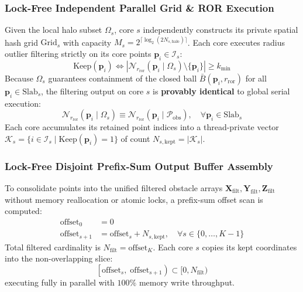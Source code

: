 \documentclass[journal,compsoc]{IEEEtran}
\begin{document}
\subsubsection{Lock-Free Independent Parallel Grid \& ROR Execution}
Given the local halo subset $\Omega_s$, core $s$ independently constructs its private spatial hash grid $\text{Grid}_s$ with capacity $M_s = 2^{\lceil \log_2(2 N_{s, \text{halo}}) \rceil}$.
Each core executes radius outlier filtering strictly on its core points $\bm{p}_i \in \mathcal{I}_s$:
\begin{equation}
\text{Keep}(\bm{p}_i) \iff \left| \mathcal{N}_{r_{\text{ror}}}(\bm{p}_i \mid \Omega_s) \setminus \{\bm{p}_i\} \right| \ge k_{\min}
\end{equation}
Because $\Omega_s$ guarantees containment of the closed ball $\bar{B}(\bm{p}_i, r_{\text{ror}})$ for all $\bm{p}_i \in \text{Slab}_s$, the filtering output on core $s$ is \textbf{provably identical} to global serial execution:
\begin{equation}
\mathcal{N}_{r_{\text{ror}}}(\bm{p}_i \mid \Omega_s) \equiv \mathcal{N}_{r_{\text{ror}}}(\bm{p}_i \mid \mathcal{P}_{\text{obs}}), \quad \forall \bm{p}_i \in \text{Slab}_s
\end{equation}
Each core accumulates its retained point indices into a thread-private vector $\mathcal{K}_s = \{ i \in \mathcal{I}_s \mid \text{Keep}(\bm{p}_i) = 1 \}$ of count $N_{s, \text{kept}} = |\mathcal{K}_s|$.

\subsubsection{Lock-Free Disjoint Prefix-Sum Output Buffer Assembly}
To consolidate points into the unified filtered obstacle arrays $\mathbf{X}_{\text{filt}}, \mathbf{Y}_{\text{filt}}, \mathbf{Z}_{\text{filt}}$ without memory reallocation or atomic locks, a prefix-sum offset scan is computed:
\begin{align}
\text{offset}_0 &= 0 \\
\text{offset}_{s+1} &= \text{offset}_s + N_{s, \text{kept}}, \quad \forall s \in \{0, \dots, K-1\}
\label{eq:prefix_sum}
\end{align}
Total filtered cardinality is $N_{\text{filt}} = \text{offset}_K$. Each core $s$ copies its kept coordinates into the non-overlapping slice:
\begin{equation}
\left[ \text{offset}_s, \; \text{offset}_{s+1} \right) \subset [0, N_{\text{filt}})
\end{equation}
executing fully in parallel with $100\%$ memory write throughput.
\end{document}
